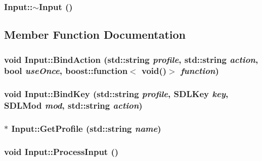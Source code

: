 \hypertarget{class_input_f2db35ba67c8a8ccd23bef6a482fc291}{
\subsubsection[{$\sim$Input}]{\setlength{\rightskip}{0pt plus 5cm}Input::$\sim$Input ()}}
\label{class_input_f2db35ba67c8a8ccd23bef6a482fc291}




\subsection{Member Function Documentation}
\hypertarget{class_input_9f5f01802b1de327b4dd03cadfad7651}{
\subsubsection[{BindAction}]{\setlength{\rightskip}{0pt plus 5cm}void Input::BindAction (std::string {\em profile}, \/  std::string {\em action}, \/  bool {\em useOnce}, \/  boost::function$<$ void()$>$ {\em function})}}
\label{class_input_9f5f01802b1de327b4dd03cadfad7651}


\hypertarget{class_input_e0e1471412ec5a992a0e258d5486aeab}{
\subsubsection[{BindKey}]{\setlength{\rightskip}{0pt plus 5cm}void Input::BindKey (std::string {\em profile}, \/  SDLKey {\em key}, \/  SDLMod {\em mod}, \/  std::string {\em action})}}
\label{class_input_e0e1471412ec5a992a0e258d5486aeab}


\hypertarget{class_input_db61ed1151c5ba9df5c53951c56efd0a}{
\subsubsection[{GetProfile}]{ $\ast$ Input::GetProfile (std::string {\em name})}}
\label{class_input_db61ed1151c5ba9df5c53951c56efd0a}


\hypertarget{class_input_79b770f9707946fd6ad48668a4ad13cc}{
\subsubsection[{ProcessInput}]{\setlength{\rightskip}{0pt plus 5cm}void Input::ProcessInput ()}}
\label{class_input_79b770f9707946fd6ad48668a4ad13cc}


